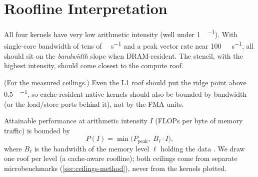 \section{Roofline Interpretation}\label{sec:roofline}

\begin{hypothesis}
  All four kernels have very low arithmetic intensity (well under \qty{1}{\flop\per\byte}). With
  single-core bandwidth of tens of \unit{\giga\byte\per\second} and a peak vector rate near
  \qty{100}{\giga\flop\per\second}, all should sit on the \emph{bandwidth} slope when DRAM-resident.
  The stencil, with the highest intensity, should come closest to the compute roof.
\end{hypothesis}
\begin{hypothesis}
  (For the measured ceilings.) Even the L1 roof should put the ridge point above
  \qty{0.5}{\flop\per\byte}, so cache-resident native kernels should also be bounded by bandwidth
  (or the load/store ports behind it), not by the FMA units.
\end{hypothesis}

Attainable performance at arithmetic intensity $I$ (FLOPs per byte of memory traffic) is bounded by
\begin{equation}
  P(I) = \min\bigl(P_{\text{peak}},\; B_{\ell} \cdot I\bigr),
\end{equation}
where $B_{\ell}$ is the bandwidth of the memory level $\ell$ holding the data
\cite{williams2009roofline}. We draw one roof per level (a cache-aware roofline); both ceilings
come from separate microbenchmarks (\cref{sec:ceilings-method}), never from the kernels plotted.

